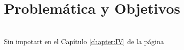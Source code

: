 \chapter{Problemática y Objetivos} \label{chapter:I}
	\lipsum
\\Sin impotart en el Capítulo \ref{chapter:IV}	de la página \pageref{chapter:IV}
	